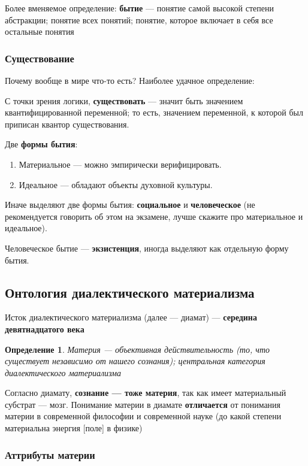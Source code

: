 \documentclass{article}
\newtheorem{definition}{Определение}
\begin{document}
\begin{flushleft}
Более вменяемое определение: \textbf{бытие} — понятие самой высокой степени абстракции; понятие всех понятий; понятие, которое включает в себя все остальные понятия

\subsubsection{Существование}

Почему вообще в мире что-то есть? Наиболее удачное определение:

С точки зрения логики, \textbf{существовать} — значит быть значением квантифицированной переменной; то есть, значением переменной, к которой был приписан квантор существования.

Две \textbf{формы бытия}:

\begin{enumerate}
    \item Материальное — можно эмпирически верифицировать.
    \item Идеальное — обладают объекты духовной культуры.
\end{enumerate}

Иначе выделяют две формы бытия: \textbf{социальное} и \textbf{человеческое} (не рекомендуется говорить об этом на экзамене, лучше скажите про материальное и идеальное).

Человеческое бытие — \textbf{экзистенция}, иногда выделяют как отдельную форму бытия.

\pagebreak
\subsection{Онтология диалектического материализма}

Исток диалектического материализма (далее — диамат) — \textbf{середина девятнадцатого века}

\begin{definition}
    Материя — объективная действительность (то, что существует независимо от нашего сознания); центральная категория диалектического материализма
\end{definition}

Согласно диамату, \textbf{сознание — тоже материя}, так как имеет материальный субстрат — мозг. Понимание материи в диамате \textbf{отличается} от понимания материи в современной философии и современной науке (до какой степени материальна энергия [поле] в физике)

\subsubsection{Аттрибуты материи}


\end{flushleft}
\end{document}
